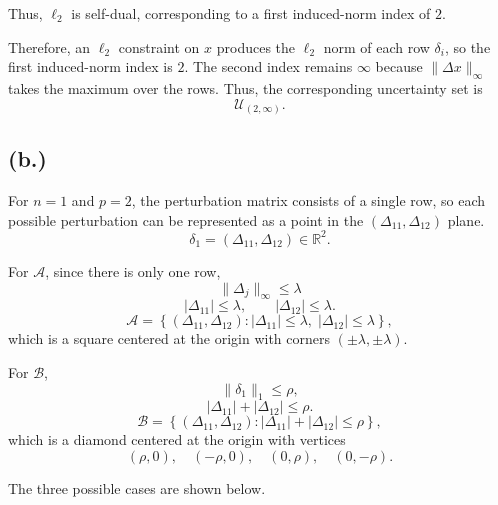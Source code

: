 \documentclass{article}
\begin{document}
Thus, $\ell_2$ is self-dual, corresponding to a first induced-norm index of $2$. 

Therefore, an $\ell_2$ constraint on $x$ produces the $\ell_2$ norm of
each row $\delta_i$, so the first induced-norm index is $2$. The second
index remains $\infty$ because $\|\Delta x\|_\infty$ takes the maximum
over the rows. Thus, the corresponding uncertainty set is
\[
\mathcal{U}_{(2,\infty)}.
\]

\vspace{7mm}

\subsection*{(b.)}


For $n=1$ and $p=2$, the perturbation matrix consists of a single row, so each possible perturbation can be represented as a point in the 
$(\Delta_{11},\Delta_{12})$ plane.
\[
\delta_1=(\Delta_{11},\Delta_{12})\in\mathbb{R}^2.
\]


For $\mathcal A$, since there is only one row,
\[
\|\Delta_j\|_\infty \leq \lambda
\]
\[
|\Delta_{11}|\leq\lambda,
\qquad
|\Delta_{12}|\leq\lambda.
\]
\[
\mathcal A
=
\left\{
(\Delta_{11},\Delta_{12}):
|\Delta_{11}|\leq\lambda,\;
|\Delta_{12}|\leq\lambda
\right\},
\]
which is a square centered at the origin with corners
$(\pm\lambda,\pm\lambda)$.

For $\mathcal B$, 
\[
\|\delta_1\|_1\leq\rho,
\]
\[
|\Delta_{11}|+|\Delta_{12}|\leq\rho.
\]
\[
\mathcal B
=
\left\{
(\Delta_{11},\Delta_{12}):
|\Delta_{11}|+|\Delta_{12}|\leq\rho
\right\},
\]
which is a diamond centered at the origin with vertices
\[
(\rho,0),\quad(-\rho,0),\quad(0,\rho),\quad(0,-\rho).
\]

The three possible cases are shown below.
\end{document}
